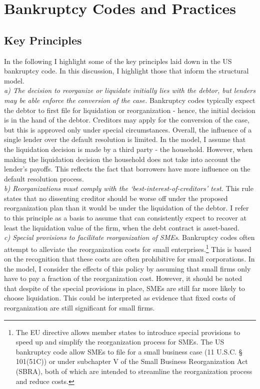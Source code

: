 \documentclass[12pt]{article}
\begin{document}
\section{Bankruptcy Codes and Practices \label{sec:A1}}
\subsection{Key Principles \label{sec:key principles}}
In the following I highlight some of the key principles laid down in the US bankruptcy code. In this discussion, I highlight those that inform the structural model. \vspace{3mm} \\
\textit{a) The decision to reorganize or liquidate initially lies with the debtor, but lenders may be able enforce the conversion of the case.} Bankruptcy codes typically expect the debtor to first file for liquidation or reorganization - hence, the initial decision is in the hand of the debtor. Creditors may apply for the conversion of the case, but this is approved only under special circumstances. Overall, the influence of a single lender over the default resolution is limited. In the model, I assume that the liquidation decision is made by a third party - the household. However, when making the liquidation decision the household does not take into account the lender's payoffs. This reflects the fact that borrowers have more influence on the default resolution process. \vspace{3mm} \\
\textit{b) Reorganizations must comply with the `best-interest-of-creditors' test.} This rule states that no dissenting creditor should be worse off under the proposed reorganization plan than it would be under the liquidation of the debtor. I refer to this principle as a basis to assume that can consistently expect to recover at least the liquidation value of the firm, when the debt contract is asset-based. \vspace{3mm} \\
\textit{c) Special provisions to facilitate reorganization of SMEs}. Bankruptcy codes often attempt to alleviate the reorganization costs for small enterprises.\footnote{The EU directive allows member states to introduce special provisions to speed up and simplify the reorganization process for SMEs. The US bankruptcy code allow SMEs to file for a small business case (11 U.S.C. § 101(51C)) or under subchapter V of the Small Business Reorganization Act (SBRA), both of which are intended to streamline the reorganization process and reduce costs.} This is based on the recognition that these costs are often prohibitive for small corporations. In the model, I consider the effects of this policy by assuming that small firms only have to pay a fraction of the reorganization cost. However, it should be noted that despite of the special provisions in place, SMEs are still far more likely to choose liquidation. This could be interpreted as evidence that fixed costs of reorganization are still significant for small firms. 
\end{document}
